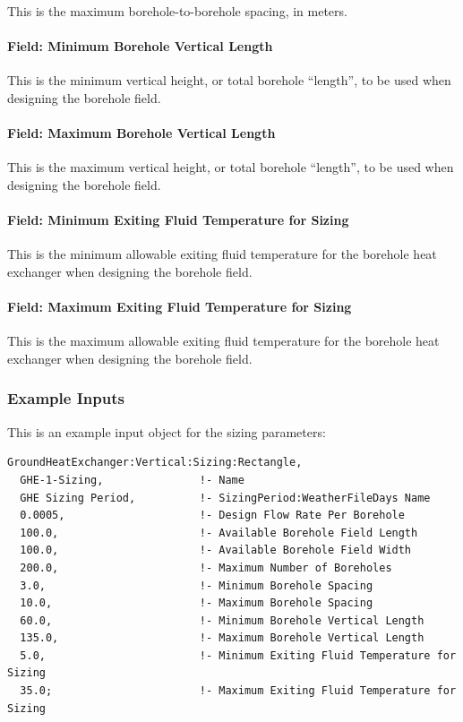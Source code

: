 This is the maximum borehole-to-borehole spacing, in meters.

\paragraph{Field: Minimum Borehole Vertical Length}

This is the minimum vertical height, or total borehole ``length'', to be used when designing the borehole field.

\paragraph{Field: Maximum Borehole Vertical Length}

This is the maximum vertical height, or total borehole ``length'', to be used when designing the borehole field.

\paragraph{Field: Minimum Exiting Fluid Temperature for Sizing}

This is the minimum allowable exiting fluid temperature for the borehole heat exchanger when designing the borehole field.

\paragraph{Field: Maximum Exiting Fluid Temperature for Sizing}

This is the maximum allowable exiting fluid temperature for the borehole heat exchanger when designing the borehole field.

\subsubsection{Example Inputs}

This is an example input object for the sizing parameters:

\begin{lstlisting}
GroundHeatExchanger:Vertical:Sizing:Rectangle,
  GHE-1-Sizing,               !- Name
  GHE Sizing Period,          !- SizingPeriod:WeatherFileDays Name
  0.0005,                     !- Design Flow Rate Per Borehole
  100.0,                      !- Available Borehole Field Length
  100.0,                      !- Available Borehole Field Width
  200.0,                      !- Maximum Number of Boreholes
  3.0,                        !- Minimum Borehole Spacing
  10.0,                       !- Maximum Borehole Spacing
  60.0,                       !- Minimum Borehole Vertical Length
  135.0,                      !- Maximum Borehole Vertical Length
  5.0,                        !- Minimum Exiting Fluid Temperature for Sizing
  35.0;                       !- Maximum Exiting Fluid Temperature for Sizing
\end{lstlisting}


